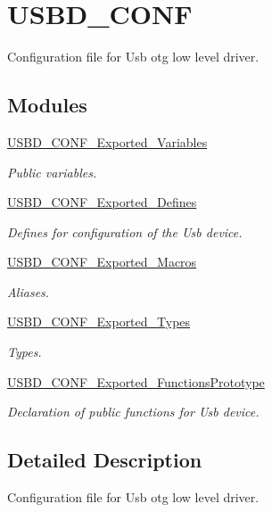 \hypertarget{group__USBD__CONF}{}\section{U\+S\+B\+D\+\_\+\+C\+O\+NF}
\label{group__USBD__CONF}


Configuration file for Usb otg low level driver.  


\subsection*{Modules}
\begin{DoxyCompactItemize}
\item 
\hyperlink{group__USBD__CONF__Exported__Variables}{U\+S\+B\+D\+\_\+\+C\+O\+N\+F\+\_\+\+Exported\+\_\+\+Variables}
\begin{DoxyCompactList}\small\item\em Public variables. \end{DoxyCompactList}\item 
\hyperlink{group__USBD__CONF__Exported__Defines}{U\+S\+B\+D\+\_\+\+C\+O\+N\+F\+\_\+\+Exported\+\_\+\+Defines}
\begin{DoxyCompactList}\small\item\em Defines for configuration of the Usb device. \end{DoxyCompactList}\item 
\hyperlink{group__USBD__CONF__Exported__Macros}{U\+S\+B\+D\+\_\+\+C\+O\+N\+F\+\_\+\+Exported\+\_\+\+Macros}
\begin{DoxyCompactList}\small\item\em Aliases. \end{DoxyCompactList}\item 
\hyperlink{group__USBD__CONF__Exported__Types}{U\+S\+B\+D\+\_\+\+C\+O\+N\+F\+\_\+\+Exported\+\_\+\+Types}
\begin{DoxyCompactList}\small\item\em Types. \end{DoxyCompactList}\item 
\hyperlink{group__USBD__CONF__Exported__FunctionsPrototype}{U\+S\+B\+D\+\_\+\+C\+O\+N\+F\+\_\+\+Exported\+\_\+\+Functions\+Prototype}
\begin{DoxyCompactList}\small\item\em Declaration of public functions for Usb device. \end{DoxyCompactList}\end{DoxyCompactItemize}


\subsection{Detailed Description}
Configuration file for Usb otg low level driver. 


